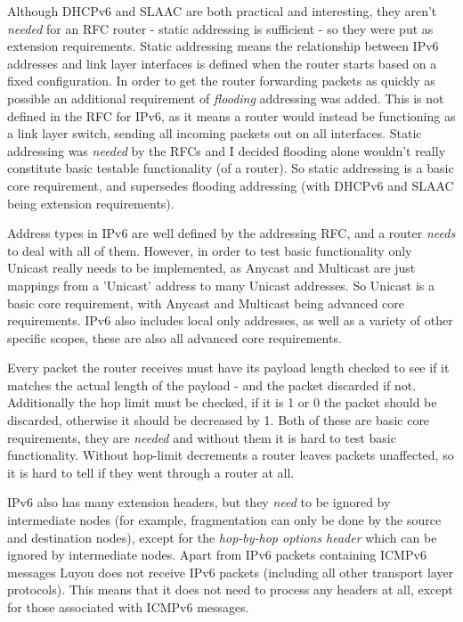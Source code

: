 \documentclass[12pt,a4paper,twoside,openright]{report}
\begin{document}
Although DHCPv6 and SLAAC are both practical and interesting, they aren't \textit{needed} for an RFC router - static addressing is sufficient - so they were put as extension requirements.  Static addressing means the relationship between IPv6 addresses and link layer interfaces is defined when the router starts based on a fixed configuration. In order to get the router forwarding packets as quickly as possible an additional requirement of \textit{flooding} addressing was added.  This is not defined in the RFC for IPv6, as it means a router would instead be functioning as a link layer switch, sending all incoming packets out on all interfaces. Static addressing was \textit{needed} by the RFCs and I decided flooding alone wouldn't really constitute basic testable functionality (of a router). So static addressing is a basic core requirement, and supersedes flooding addressing (with DHCPv6 and SLAAC being extension requirements).

Address types in IPv6 are well defined by the addressing RFC\cite{ipv6_rfc_adr}, and a router \textit{needs} to deal with all of them.  However, in order to test basic functionality only Unicast really needs to be implemented, as Anycast and Multicast are just mappings from a 'Unicast' address to many Unicast addresses. So Unicast is a basic core requirement, with Anycast and Multicast being advanced core requirements. IPv6 also includes local only addresses, as well as a variety of other specific scopes, these are also all advanced core requirements.

\bigskip

Every packet the router receives must have its payload length checked to see if it matches the actual length of the payload - and the packet discarded if not.  Additionally the hop limit must be checked, if it is 1 or 0 the packet should be discarded, otherwise it should be decreased by 1.  Both of these are basic core requirements, they are \textit{needed} and without them it is hard to test basic functionality. Without hop-limit decrements a router leaves packets unaffected, so it is hard to tell if they went through a router at all.

IPv6 also has many extension headers, but they \textit{need} to be ignored by intermediate nodes (for example, fragmentation can only be done by the source and destination nodes), except for the \textit{hop-by-hop options header} which can be ignored by intermediate nodes. Apart from IPv6 packets containing ICMPv6 messages Luyou does not receive IPv6 packets (including all other transport layer protocols).  This means that it does not need to process any headers at all, except for those associated with ICMPv6 messages.
\end{document}
